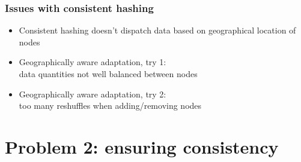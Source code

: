 \documentclass[aspectratio=169]{beamer}
\begin{document}
\begin{frame}
	\frametitle{Issues with consistent hashing}
	\begin{itemize}
		\item Consistent hashing doesn't dispatch data based on geographical location of nodes
			\vspace{1em}
		\item<2-> Geographically aware adaptation, try 1:\\
			data quantities not well balanced between nodes
			\vspace{1em}
		\item<3-> Geographically aware adaptation, try 2:\\
			too many reshuffles when adding/removing nodes
	\end{itemize}
\end{frame}


\section{Problem 2: ensuring consistency}
\end{document}
